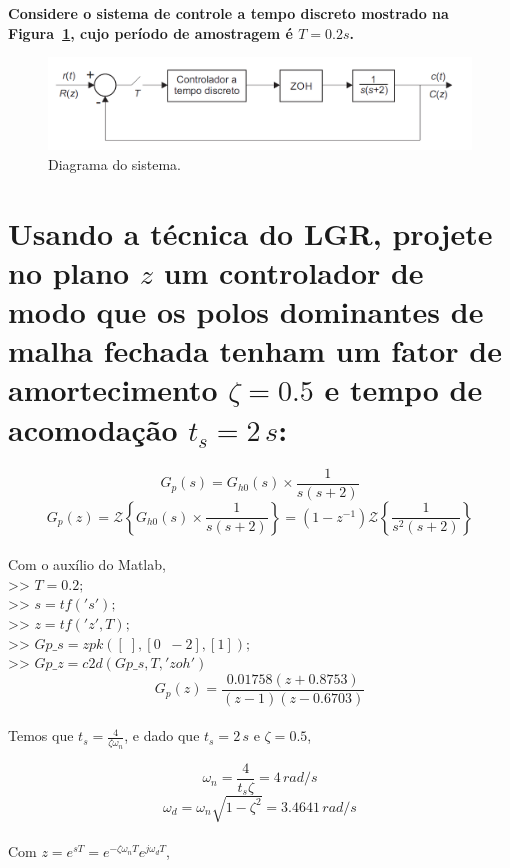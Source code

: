 \documentclass{article}
\begin{document}
{\Large \bf Considere o sistema de controle a tempo discreto mostrado na
    Figura~\ref{fig:q2_diagrama}, cujo período de amostragem é $T = 0.2 s$.}

    \begin{figure}[H]
       \centering
            \includegraphics[width=1\linewidth]{images/q2_diagrama.png}
            \caption{Diagrama do sistema.}
            \label{fig:q2_diagrama}
    \end{figure}

    \section{Usando a técnica do LGR, projete no plano $z$ um controlador de
        modo que os polos dominantes de malha fechada tenham um fator de
        amortecimento $\zeta = 0.5$ e tempo de acomodação $t_s = 2\,s$:}

        \[ G_p(s) = G_{h0}(s) \times \frac{1}{s(s+2)} \]
        \[
            G_p(z) = \mathcal{Z}\left\{ G_{h0}(s) \times \frac{1}{s(s+2)} \right\}
                = (1-z^{-1}) \mathcal{Z}\left\{ \frac{1}{s^2 (s+2)} \right\}
        \]\\

        {Com o auxílio do Matlab,\\
        >> $T = 0.2;$\\
        >> $s = tf('s');$\\
        >> $z = tf('z', T);$\\
        >> $Gp\_s = zpk([\;], [0 \;\; -2], [1]);$\\
        >> $Gp\_z = c2d(Gp\_s, T, 'zoh')$ }\\

        \[ G_p(z) = \frac{0.01758(z+0.8753)}{(z-1)(z-0.6703)} \]\\

        {Temos que $t_s = \frac{4}{\zeta\omega_n}$, e dado que $t_s = 2\,s$ e
            $\zeta = 0.5$,}

        \[ \omega_n = \frac{4}{t_s\zeta} = 4 \,rad/s \]
        \[ \omega_d = \omega_n\sqrt{1-\zeta^2} = 3.4641 \,rad/s \]\\

        {Com $z = e^{sT} = e^{-\zeta\omega_nT}e^{j\omega_dT}$,}
\end{document}

